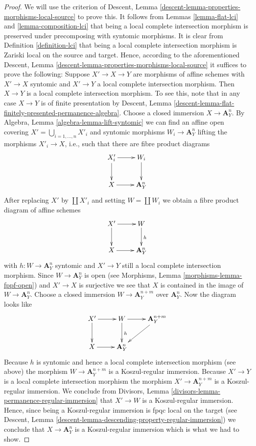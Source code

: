 \documentclass[10pt,a4paper]{amsart}
\theoremstyle{plain}
\theoremstyle{definition}
\theoremstyle{remark}
\numberwithin{equation}{subsection}
\begin{document}
\begin{proof}
We will use the criterion of
Descent, Lemma \ref{descent-lemma-properties-morphisms-local-source}
to prove this. It follows from
Lemmas \ref{lemma-flat-lci} and
\ref{lemma-composition-lci}
that being a local complete intersection morphism is preserved under
precomposing with syntomic morphisms. It is clear from
Definition \ref{definition-lci}
that being a local complete intersection morphism is Zariski local on the
source and target. Hence, according to the aforementioned
Descent, Lemma \ref{descent-lemma-properties-morphisms-local-source}
it suffices to prove the following: Suppose $X' \to X \to Y$ are
morphisms of affine schemes with $X' \to X$ syntomic and $X' \to Y$
a local complete intersection morphism. Then $X \to Y$ is a local complete
intersection morphism. To see this, note that in any case $X \to Y$ is of
finite presentation by
Descent, Lemma \ref{descent-lemma-flat-finitely-presented-permanence-algebra}.
Choose a closed immersion $X \to \mathbf{A}^n_Y$. By
Algebra, Lemma \ref{algebra-lemma-lift-syntomic}
we can find an affine open covering $X' = \bigcup_{i = 1, \ldots, n} X'_i$
and syntomic morphisms $W_i \to \mathbf{A}^n_Y$ lifting the morphisms
$X'_i \to X$, i.e., such that there are fibre product diagrams
$$
\xymatrix{
X'_i \ar[d] \ar[r] & W_i \ar[d] \\
X \ar[r] & \mathbf{A}^n_Y
}
$$
After replacing $X'$ by $\coprod X'_i$ and setting $W = \coprod W_i$
we obtain a fibre product diagram of affine schemes
$$
\xymatrix{
X' \ar[d] \ar[r] & W \ar[d]^h \\
X \ar[r] & \mathbf{A}^n_Y
}
$$
with $h : W \to \mathbf{A}^n_Y$ syntomic and $X' \to Y$ still a local complete
intersection morphism. Since $W \to \mathbf{A}^n_Y$ is open (see
Morphisms, Lemma \ref{morphisms-lemma-fppf-open})
and $X' \to X$ is surjective we see that $X$ is contained in the image
of $W \to \mathbf{A}^n_Y$. Choose a closed immersion
$W \to \mathbf{A}^{n + m}_Y$ over $\mathbf{A}^n_Y$. Now the diagram looks like
$$
\xymatrix{
X' \ar[d] \ar[r] & W \ar[d]^h \ar[r] & \mathbf{A}^{n + m}_Y \ar[ld] \\
X \ar[r] & \mathbf{A}^n_Y
}
$$
Because $h$ is syntomic and hence a local complete intersection morphism (see
above) the morphism $W \to \mathbf{A}^{n + m}_Y$ is a Koszul-regular immersion.
Because $X' \to Y$ is a local complete intersection morphism the morphism
$X' \to \mathbf{A}^{n + m}_Y$ is a Koszul-regular immersion. We conclude from
Divisors, Lemma \ref{divisors-lemma-permanence-regular-immersion}
that $X' \to W$ is a Koszul-regular immersion. Hence, since being
a Koszul-regular immersion is fpqc local on the target (see
Descent, Lemma \ref{descent-lemma-descending-property-regular-immersion})
we conclude that $X \to \mathbf{A}^n_Y$ is a Koszul-regular immersion
which is what we had to show.
\end{proof}
\end{document}
